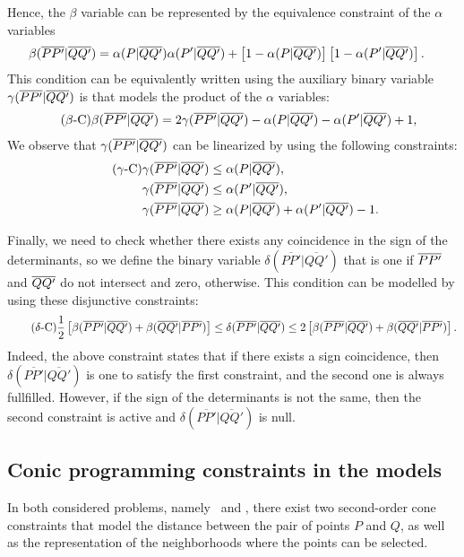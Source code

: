 \documentclass[a4paper]{elsarticle}
\newcommand{\SPPN}{{\sf{H-SPPN}\xspace }}
\newcommand{\TSPN}{{\sf{H-TSPN}\xspace }}
\begin{document}
Hence, the $\beta$ variable can be represented by the equivalence constraint of the $\alpha$ variables
\begin{align*}%
\betamas{P}{P'}{Q}{Q'}&=\alphamas{P}{Q}{Q'}\alphamas{P'}{Q}{Q'} + \left[1-\alphamas{P}{Q}{Q'}\right]\left[1-\alphamas{P'}{Q}{Q'}\right].
\end{align*}
This condition can be equivalently written using the auxiliary binary variable $\gamma(\overline{PP'}|\overline{QQ'})$ is  that models the product of the $\alpha$ variables:
\begin{align*}\tag{$\beta$-C}\label{eq:betaC}
\beta(\overline{PP'}|\overline{QQ'})&=2\gamma(\overline{PP'}|\overline{QQ'}) -\alpha(P|\overline{QQ'})-\alpha(P'|\overline{QQ'})+1,
\end{align*}
We observe that $\gamma(\overline{PP'}|\overline{QQ'})$ can be linearized by using the following constraints:
\begin{align*}\tag{$\gamma$-C}\label{eq:gammaC}
\gamma(\overline{PP'}|\overline{QQ'}) & \leq \alpha(P|\overline{QQ'}),\\
\gamma(\overline{PP'}|\overline{QQ'}) & \leq \alpha(P'|\overline{QQ'}),\\
\gamma(\overline{PP'}|\overline{QQ'}) & \geq \alpha(P|\overline{QQ'}) + \alpha(P'|\overline{QQ'}) - 1.
\end{align*}
 

\newcommand{\deltacheck}[4]{\delta(\overline{#1#2}|\overline{#3#4})}

Finally, we need to check whether there exists any coincidence in the sign of the determinants, so we define the binary variable $\deltacheck{P}{P'}{Q}{Q'}$ that is one if $\overline{PP'}$ and $\overline{QQ'}$ do not intersect and zero, otherwise. This condition can be modelled by using these disjunctive constraints:
\begin{equation*}\tag{$\delta$-C}\label{eq:deltaC}
\frac{1}{2}\left[\betamas{P}{P'}{Q}{Q'}+\betamas{Q}{Q'}{P}{P'}\right]\leq\deltacheck{P}{P'}{Q}{Q'}\leq 2\left[\betamas{P}{P'}{Q}{Q'}+\betamas{Q}{Q'}{P}{P'}\right].
\end{equation*}
Indeed, the above constraint states that if there exists a sign coincidence, then $\deltacheck{P}{P'}{Q}{Q'}$ is one to satisfy the first constraint, and the second one is always fullfilled. However, if the sign of the determinants is not the same, then the second constraint is active and $\deltacheck{P}{P'}{Q}{Q'}$ is null.

\subsection{Conic programming constraints in the models}
In both considered  problems, namely \SPPN \ and \TSPN, there exist two second-order cone constraints that model the distance between the pair of points $P$ and $Q$, as well as  the representation of the neighborhoods where the points can be selected.
\end{document}
